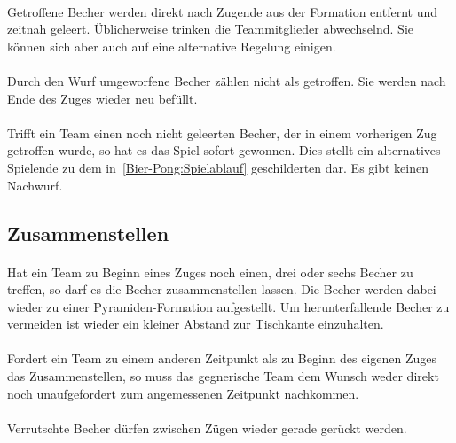 \paragraph{}
Getroffene Becher werden direkt nach Zugende aus der Formation entfernt und zeitnah geleert.
Üblicherweise trinken die Teammitglieder abwechselnd.
Sie können sich aber auch auf eine alternative Regelung einigen.

\paragraph{}
Durch den Wurf umgeworfene Becher zählen nicht als getroffen.
Sie werden nach Ende des Zuges wieder neu befüllt.

\paragraph{}
Trifft ein Team einen noch nicht geleerten Becher, der in einem vorherigen Zug getroffen wurde, so hat es das Spiel sofort gewonnen.
Dies stellt ein alternatives Spielende zu dem in~\ref{Bier-Pong:Spielablauf} geschilderten dar.
Es gibt keinen Nachwurf.

\subsection{Zusammenstellen}
\paragraph{}
Hat ein Team zu Beginn eines Zuges noch einen, drei oder sechs Becher zu treffen, so darf es die Becher zusammenstellen lassen.
Die Becher werden dabei wieder zu einer Pyramiden-Formation aufgestellt.
Um herunterfallende Becher zu vermeiden ist wieder ein kleiner Abstand zur Tischkante einzuhalten.

\paragraph{}
Fordert ein Team zu einem anderen Zeitpunkt als zu Beginn des eigenen Zuges das Zusammenstellen, so muss das gegnerische Team dem Wunsch weder direkt noch unaufgefordert zum angemessenen Zeitpunkt nachkommen.

\paragraph{}
Verrutschte Becher dürfen zwischen Zügen wieder gerade gerückt werden.

